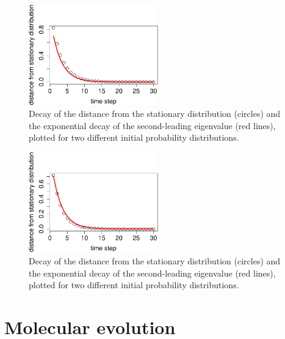 \documentclass[
  letterpaper,
  DIV=11,
  numbers=noendperiod]{scrreprt}
\begin{document}
\begin{figure}[H]

{\centering \includegraphics[width=0.5\textwidth,height=\textheight]{./markov_eigen_files/figure-pdf/comp13-5-1.pdf}

}

\caption{Decay of the distance from the stationary distribution
(circles) and the exponential decay of the second-leading eigenvalue
(red lines), plotted for two different initial probability
distributions.}

\end{figure}

\begin{figure}[H]

{\centering \includegraphics[width=0.5\textwidth,height=\textheight]{./markov_eigen_files/figure-pdf/comp13-5-2.pdf}

}

\caption{Decay of the distance from the stationary distribution
(circles) and the exponential decay of the second-leading eigenvalue
(red lines), plotted for two different initial probability
distributions.}

\end{figure}

\hypertarget{molecular-evolution}{%
\section{Molecular evolution}\label{molecular-evolution}}
\end{document}
